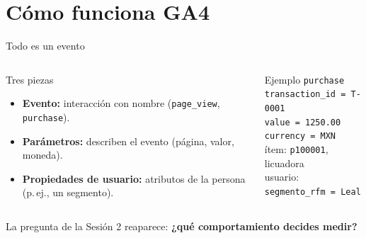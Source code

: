 \documentclass[aspectratio=169,xcolor=dvipsnames]{beamer}
\begin{document}
\section[Cómo funciona]{Cómo funciona GA4}

\begin{frame}{Todo es un evento}
\begin{columns}[T]
  \begin{block}{Tres piezas}
    \small
    \begin{itemize}
      \item \textbf{Evento:} interacción con nombre (\texttt{page\_view}, \texttt{purchase}).
      \item \textbf{Parámetros:} describen el evento (página, valor, moneda).
      \item \textbf{Propiedades de usuario:} atributos de la persona (p.\,ej., un segmento).
    \end{itemize}
  \end{block}
  \begin{exampleblock}{Ejemplo}
    \scriptsize
    \texttt{purchase}\\[2pt]
    \hspace{1em}\texttt{transaction\_id = T-0001}\\
    \hspace{1em}\texttt{value = 1250.00}\\
    \hspace{1em}\texttt{currency = MXN}\\
    \hspace{1em}ítem: \texttt{p100001}, licuadora\\[3pt]
    usuario: \texttt{segmento\_rfm = Leal}
  \end{exampleblock}
\end{columns}
\vspace{4pt}
\begin{center}\small La pregunta de la Sesión 2 reaparece: \textbf{¿qué comportamiento decides medir?}\end{center}
\end{frame}
\end{document}
